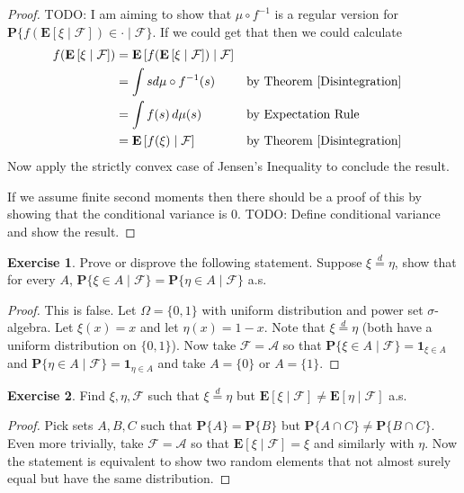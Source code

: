 \documentclass{amsbook}
\theoremstyle{definition}
\newtheorem{xca}{Exercise}
\theoremstyle{remark}
\newcommand{\cexpectationlong}[2]{\textbf{E}\left[ #2 \mid #1 \right]}
\newcommand{\probability}[1]{\textbf{P}\{#1\}}
\newcommand{\cprobability}[2]{\textbf{P}\{#2 \mid #1\}}
\newcommand{\characteristic}[1]{\textbf{1}_{#1}}
\newcommand{\pushforward}[2]{#2 \circ #1^{-1}}
\newcommand{\eqdist}{\overset{d}=}
\begin{document}
\begin{proof}
TODO: I am aiming to show that $\pushforward{f}{\mu}$ is a regular version
for
$\cprobability{\mathcal{F}}{f(\cexpectationlong{\mathcal{F}}{\xi}) \in
\cdot}$.
If we could get that then we could calculate
\begin{align*}
f(\cexpectationlong{\mathcal{F}}{\xi}) &=
\cexpectationlong{\mathcal{F}}
{f(\cexpectationlong{\mathcal{F}}{\xi})} \\
&= \int s d \pushforward{f}{\mu} (s) & & \text{by Theorem \ref{Disintegration}}\\
&= \int f(s) \, d\mu(s)  & & \text{by Expectation Rule} \\
&= \cexpectationlong{\mathcal{F}}{f(\xi)} & & \text{by Theorem \ref{Disintegration}}
\end{align*}
Now apply the strictly convex case of Jensen's Inequality to conclude
the result.

If we assume finite second moments then there should be a proof of
this by showing that the conditional variance is $0$.  TODO: Define
conditional variance and show the result.
\end{proof}

\begin{xca}Prove or disprove the following statement.  Suppose $\xi \eqdist \eta$, show that for every $A$, 
  $\cprobability{\mathcal{F}}{\xi \in A} =
  \cprobability{\mathcal{F}}{\eta \in A}$ a.s.
\end{xca}
\begin{proof}
This is false.  Let $\Omega = \lbrace 0,1 \rbrace$ with uniform distribution and
power set $\sigma$-algebra.  Let
$\xi(x) = x$ and let $\eta(x) = 1 - x$.  Note that $\xi \eqdist
\eta$ (both have a uniform distribution on $\lbrace 0,1 \rbrace$). Now take $\mathcal{F} = \mathcal{A}$ so that
$\cprobability{\mathcal{F}}{\xi \in A} = \characteristic{\xi \in A}$
and $\cprobability{\mathcal{F}}{\eta \in A} = \characteristic{\eta \in
  A}$ and take $A = \lbrace 0 \rbrace$ or $A = \lbrace 1 \rbrace$.
\end{proof}

\begin{xca}Find $\xi, \eta, \mathcal{F}$ such that $\xi \eqdist \eta$
  but $\cexpectationlong{\mathcal{F}}{\xi} \neq
  \cexpectationlong{\mathcal{F}}{\eta}$ a.s.
\end{xca}
\begin{proof}
Pick sets $A,B,C$ such that $\probability{A} = \probability{B}$ but
$\probability{A \cap C} \neq \probability{B \cap C}$.  Even more
trivially, take $\mathcal{F} = \mathcal{A}$ so that
$\cexpectationlong{\mathcal{F}}{\xi} = \xi$ and similarly with
$\eta$.  Now the statement is equivalent to show two random elements
that not almost surely equal but have the same distribution.
\end{proof}
\end{document}
